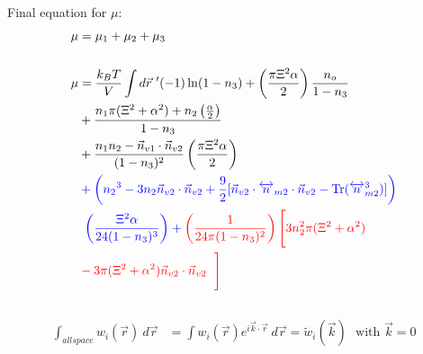 \documentclass[double,12pt]{revtex4-2}
\begin{document}
Final equation for $\mu$:  
\begin{align}
   \mu &= \mu_1 + \mu_2 + \mu_3  \\ \nonumber \\
%
   \mu &=\frac{k_BT}{V}\int d\vec r~' (-1)\ln(1-n_3)+\left(
        \frac{\pi\Xi^2\alpha}{2}\right)\frac{n_o}
        {1-n_3} \\
    &+ \frac{n_1\pi(\Xi^2 + \alpha^2)
       +n_2\left(\frac{\alpha}{2}\right)}{1-n_3} \\
       &+ \frac{n_1n_2-\vec n_{v1}
         \cdot \vec n_{v2}}{(1-n_3)^2}
          \left(\frac{\pi\Xi^2\alpha}{2}\right) \\
   &\color{blue}+\left({n_2}^3-3n_2
   \vec{n}_{v2}\cdot\vec{n}_{v2} 
    +\frac{9}{2}[\vec{n}_{v2}\cdot{\overleftrightarrow{n}_{m2}}\cdot{
    \vec{n}_{v2}}-\operatorname{Tr}({\overleftrightarrow{n}^3_{m2}})]
    \right) \\
    &\color{blue}~\left(\frac{\Xi^2\alpha}{24(1-n_3)^3}
    \right) + \color{red}\left(\frac{1}{24\pi(1-n_3)^2}\right)\Bigg[
    \color{white}\color{black}
    \color{red}3n_2^2\pi(\Xi^2 + \alpha^2) \color{white}\Bigg] \\
    &\color{red}- 3\pi(\Xi^2 + \alpha^2)\vec n_{v2} \cdot \vec n_{v2}
    \color{white}\Bigg[\color{black}\color{red}\Bigg]
\end{align}

\[\]
\[\]
\[\]
\[\]
\[\]
\[\]


\begin{align}
   \int_{all space} w_i(\vec r) ~d\vec r &= \int w_i(\vec r)e^{i\vec k \cdot 
   \vec r}~d\vec r 
    = \widetilde{w}_i(\vec k) \mbox{~~with $\vec k = 0$}
\end{align}
\end{document}
